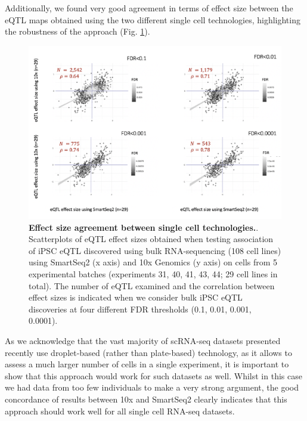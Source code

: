 \newpage

Additionally, we found very good agreement in terms of effect size between the eQTL maps obtained using the two different single cell technologies, highlighting the robustness of the approach (Fig. \ref{fig:sc_eqtl_technologies}).\\

\begin{figure}[h]
\centering
\includegraphics[width=15cm]{Chapter3/Fig/beta_comparison_ss2_vs_10x.png}
\caption[iPSC sc-eQTL replication across technologies]{\textbf{Effect size agreement between single cell technologies.}.\\
Scatterplots of eQTL effect sizes obtained when testing association of iPSC eQTL discovered using bulk RNA-sequencing (108 cell lines) using SmartSeq2 (x axis) and 10x Genomics (y axis) on cells from 5 experimental batches (experiments 31, 40, 41, 43, 44; 29 cell lines in total). 
The number of eQTL examined and the correlation between effect sizes is indicated when we consider bulk iPSC eQTL discoveries at four different FDR thresholds (0.1, 0.01, 0.001, 0.0001).}
\label{fig:sc_eqtl_technologies}
\end{figure}

As we acknowledge that the vast majority of scRNA-seq datasets presented recently use droplet-based (rather than plate-based) technology, as it allows to assess a much larger number of cells in a single experiment, it is important to show that this approach would work for such datasets as well. 
Whilst in this case we had data from too few individuals to make a very strong argument, the good concordance of results between 10x and SmartSeq2 clearly indicates that this approach should work well for all single cell RNA-seq datasets.

